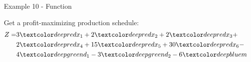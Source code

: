 \begin{frame}{Example 10 - Function}

Get a profit-maximizing production schedule:
\Huge{
\begin{align*}
    Z =& 3\colora{x_1} + 2 \colora{x_2} + 2 \colora{x_3} + \\
       & 2\colora{x_4} + 15\colora{x_5} + 30\colora{x_6} - \\
       & 4\colorb{d_1} - 3 \colorb{d_2} - 6 \colorc{m}
\end{align*}
}

\end{frame}
